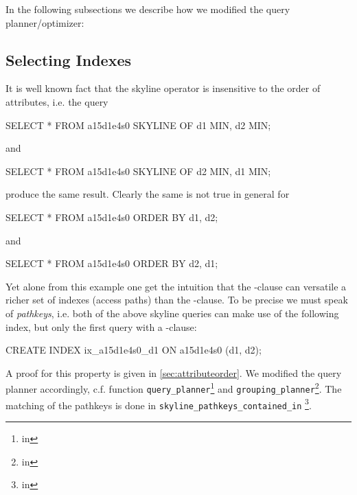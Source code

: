 In the following subsections we describe how we modified the query
planner/optimizer:


\subsection{Selecting Indexes}
It is well known fact that the skyline operator is insensitive to the
order of attributes, i.e. the query

\begin{interactive}
SELECT * FROM a15d1e4s0 SKYLINE OF d1 MIN, d2 MIN;
\end{interactive}

\noindent
and

\begin{interactive}
SELECT * FROM a15d1e4s0 SKYLINE OF d2 MIN, d1 MIN;
\end{interactive}

\noindent
produce the same result.  Clearly the same is not true in general for

\begin{interactive}
SELECT * FROM a15d1e4s0 ORDER BY d1, d2;
\end{interactive}

\noindent
and

\begin{interactive}
SELECT * FROM a15d1e4s0 ORDER BY d2, d1;
\end{interactive}

\noindent
Yet alone from this example one get the intuition that the
-clause can versatile a richer set of indexes
(access paths) than the -clause.  To be
precise we must speak of \emph{pathkeys}, i.e. both of
the above skyline queries can make use of the following index, but
only the first query with a -clause:

\begin{interactive}
CREATE INDEX ix_a15d1e4s0_d1 ON a15d1e4s0 (d1, d2);
\end{interactive}

A proof for this property is given in
\autoref{sec:attributeorder}. We modified the query planner
accordingly, c.f.  function \texttt{query\_planner}\footnote{in
} and
\texttt{grouping\_planner}\footnote{in }.
The matching of the pathkeys is done in \texttt{skyline\_pathkeys\_contained\_in}
\footnote{in }.

